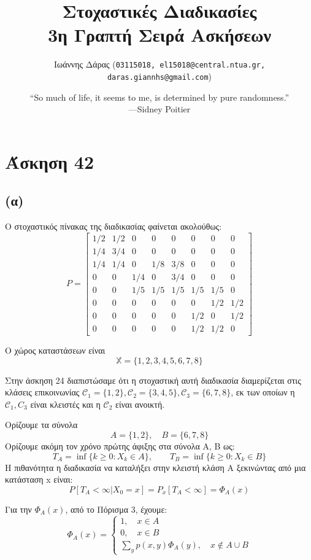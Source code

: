 \documentclass[a4paper,oneside, 11pt]{article}
\title{\textbf{Στοχαστικές Διαδικασίες \\ 3η Γραπτή Σειρά Ασκήσεων}}
\author{ Ιωάννης Δάρας (\texttt{03115018, el15018@central.ntua.gr, daras.giannhs@gmail.com}) \\
}
\date{“So much of life, it seems to me, is determined by pure randomness.” \\ —Sidney Poitier}
\begin{document}
\maketitle
\noindent\makebox[\linewidth]{\rule{\paperwidth}{0.4pt}}



\section*{Άσκηση 42}
\subsection*{(α)}
Ο στοχαστικός πίνακας της διαδικασίας φαίνεται ακολούθως:
$$
P = \begin{bmatrix}
1/2 & 1/2 & 0 & 0 & 0 & 0 & 0 & 0 \\
1/4 & 3/4 & 0 & 0 & 0 & 0 & 0 & 0 \\
1/4 & 1/4 & 0 & 1/8 & 3/8 & 0 & 0 & 0 \\
0 & 0 & 1/4 & 0 & 3/4 & 0 & 0 & 0 \\
0 & 0 & 1/5 & 1/5 & 1/5 & 1/5 & 1/5 & 0 \\
0 & 0 & 0 & 0 & 0 & 0 & 1/2 & 1/2 \\
0 & 0 & 0 & 0 & 0 & 1/2 & 0 & 1/2 \\
0 & 0 & 0 & 0 & 0 & 1/2 & 1/2 & 0 
\end{bmatrix}
$$

Ο χώρος καταστάσεων είναι $$\mathbb X = \{ 1,2,3,4,5,6,7,8 \}$$


Στην άσκηση 24 διαπιστώσαμε ότι η στοχαστική αυτή διαδικασία διαμερίζεται στις κλάσεις επικοινωνίας $\mathcal C_1 = \{1,2\}, \mathcal C_2 = \{3,4,5\}, \mathcal C_3=\{6,7,8\}$, εκ των οποίων η $\mathcal C_1, C_3$ είναι κλειστές και η $\mathcal C_2$ είναι ανοικτή. \bigbreak

Ορίζουμε τα σύνολα $$A = \{1,2\}, \quad B = \{ 6, 7, 8\}$$
Ορίζουμε ακόμη τον χρόνο πρώτης άφιξης στα σύνολα A, B ως:
$$
T_A = \inf\{ k\geq 0: X_k \in A\}, \qquad T_B = \inf\{ k \geq 0: X_k \in B\}
$$
H πιθανότητα η διαδικασία να καταλήξει στην κλειστή κλάση A ξεκινώντας από μια κατάσταση x είναι:
$$
P[T_A < \infty | X_0 = x] = P_x[T_A < \infty] = \Phi_A(x)
$$

Για την $\Phi_A(x)$, από το Πόρισμα 3, έχουμε:
$$
\Phi_A(x) =  \begin{cases}
1, \quad x \in A \\
0, \quad x \in B \\
\sum_{y} p(x,y) \Phi_A(y), \quad x \not\in A \cup B
\end{cases}
$$
\end{document}
